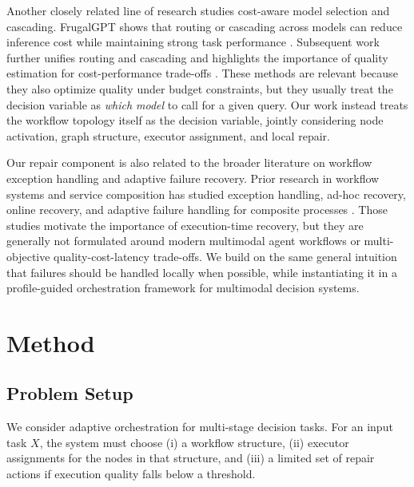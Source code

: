 \documentclass[acmsmall,review,anonymous]{acmart}
\begin{document}
Another closely related line of research studies cost-aware model selection and cascading. FrugalGPT shows that routing or cascading across models can reduce inference cost while maintaining strong task performance \cite{chen2023frugalgpt}. Subsequent work further unifies routing and cascading and highlights the importance of quality estimation for cost-performance trade-offs \cite{dekoninck2024routing,gao2024constraintaware,liu2024risk}. These methods are relevant because they also optimize quality under budget constraints, but they usually treat the decision variable as \emph{which model} to call for a given query. Our work instead treats the workflow topology itself as the decision variable, jointly considering node activation, graph structure, executor assignment, and local repair.

Our repair component is also related to the broader literature on workflow exception handling and adaptive failure recovery. Prior research in workflow systems and service composition has studied exception handling, ad-hoc recovery, online recovery, and adaptive failure handling for composite processes \cite{chiu2001exception,sato2010adaff,hutter2023online,wang2023adaptive}. Those studies motivate the importance of execution-time recovery, but they are generally not formulated around modern multimodal agent workflows or multi-objective quality-cost-latency trade-offs. We build on the same general intuition that failures should be handled locally when possible, while instantiating it in a profile-guided orchestration framework for multimodal decision systems.









\section{Method}
\label{sec:method}

\subsection{Problem Setup}

We consider adaptive orchestration for multi-stage decision tasks. For an input task $X$, the system must choose (i) a workflow structure, (ii) executor assignments for the nodes in that structure, and (iii) a limited set of repair actions if execution quality falls below a threshold.
\end{document}
